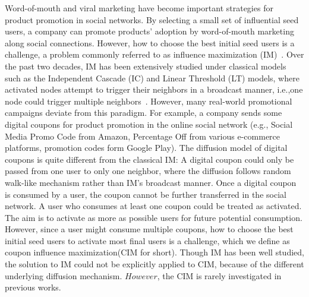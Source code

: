 \documentclass[sigconf]{acmart}
\begin{document}
Word-of-mouth and viral marketing have become important strategies for
product promotion in social networks.
By selecting a small set of influential seed users, a company can
promote products' adoption by word-of-mouth marketing along social connections.
However, how to choose the best initial seed users is a challenge,
 a problem commonly referred
to as influence maximization (IM)~\cite{kempe2003maximizing}.
Over the past two decades, IM has been extensively studied under
classical models such as the Independent Cascade (IC) and Linear
Threshold (LT) models, where activated nodes attempt to trigger their
neighbors in a broadcast manner, i.e.,one node could trigger multiple neighbors~\cite{domingos2001mining,borgs2014maximizing,tang2015influence}.
However, many real-world promotional campaigns deviate from this
paradigm.
For example, a company sends some digital coupons for product promotion in the online social network (e.g., Social Media Promo Code from Amazon, Percentage Off from various e-commerce platforms,
promotion codes form Google Play). The diffusion model of digital coupons is quite  different from the classical IM: A digital coupon could only be passed from one user to only one neighbor, where the diffusion follows random walk-like mechanism rather than IM's broadcast manner. Once a digital coupon is consumed by a user, the coupon cannot be further transferred in the social network. A user who consumes at least one coupon could be treated as activated. The aim is  to activate as more as possible users for future potential consumption. However, since a user might consume multiple coupons, how to choose the best initial seed users to activate most final users is a challenge, which we define as coupon influence maximization(CIM for short). Though IM has been well studied, the solution to IM could not be explicitly applied to CIM, because of the different underlying  diffusion mechanism. \textcolor[rgb]{1.00,0.00,0.00}{$However$}, the CIM is rarely investigated in previous works.
\end{document}
